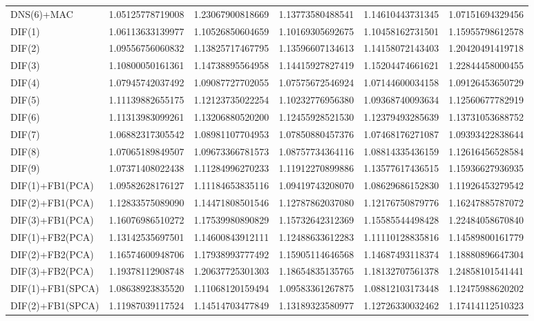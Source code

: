 \begin{table}[H]
\begin{adjustbox}{totalheight=\baselineskip}
\begin{tabular}{lSSSSS}
DNS(6)+MAC & 1.05125778719008 & 1.23067900818669 & 1.13773580488541 & 1.14610443731345 & 1.07151694329456 \\ 
DIF(1) & 1.06113633139977 & 1.10526850604659 & 1.10169305692675 & 1.10458162731501 & 1.15955798612578 \\ 
DIF(2) & 1.09556756060832 & 1.13825717467795 & 1.13596607134613 & 1.14158072143403 & 1.20420491419718 \\ 
DIF(3) & 1.10800050161361 & 1.14738895564958 & 1.14415927827419 & 1.15204474661621 & 1.22844458000455 \\ 
DIF(4) & 1.07945742037492 & 1.09087727702055 & 1.07575672546924 & 1.07144600034158 & 1.09126453650729 \\ 
DIF(5) & 1.11139882655175 & 1.12123735022254 & 1.10232776956380 & 1.09368740093634 & 1.12560677782919 \\ 
DIF(6) & 1.11313983099261 & 1.13206880520200 & 1.12455928521530 & 1.12379493285639 & 1.13731053688752 \\ 
DIF(7) & 1.06882317305542 & 1.08981107704953 & 1.07850880457376 & 1.07468176271087 & 1.09393422838644 \\ 
DIF(8) & 1.07065189849507 & 1.09673366781573 & 1.08757734364116 & 1.08814335436159 & 1.12616456528584 \\ 
DIF(9) & 1.07371408022438 & 1.11284996270233 & 1.11912270899886 & 1.13577617436515 & 1.15936627936935 \\ 
DIF(1)+FB1(PCA) & 1.09582628176127 & 1.11184653835116 & 1.09419743208070 & 1.08629686152830 & 1.11926453279542 \\ 
DIF(2)+FB1(PCA) & 1.12833575089090 & 1.14471808501546 & 1.12787862037080 & 1.12176750879776 & 1.16247885787072 \\ 
DIF(3)+FB1(PCA) & 1.16076986510272 & 1.17539980890829 & 1.15732642312369 & 1.15585544498428 & 1.22484058670840 \\ 
DIF(1)+FB2(PCA) & 1.13142535697501 & 1.14600843912111 & 1.12488633612283 & 1.11110128835816 & 1.14589800161779 \\ 
DIF(2)+FB2(PCA) & 1.16574600948706 & 1.17938993777492 & 1.15905114646568 & 1.14687493118374 & 1.18880896647304 \\ 
DIF(3)+FB2(PCA) & 1.19378112908748 & 1.20637725301303 & 1.18654835135765 & 1.18132707561378 & 1.24858101541441 \\ 
DIF(1)+FB1(SPCA) & 1.08638923835520 & 1.11068120159494 & 1.09583361267875 & 1.08812103173448 & 1.12475988620202 \\ 
DIF(2)+FB1(SPCA) & 1.11987039117524 & 1.14514703477849 & 1.13189323580977 & 1.12726330032462 & 1.17414112510323 \\ 

\end{tabular}
\end{adjustbox}
\end{table}
